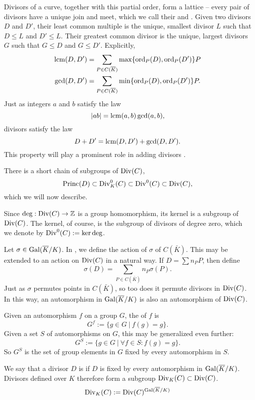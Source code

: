 Divisors of a curve, together with this partial order, form a lattice --
every pair of divisors have a unique join and meet,
which we call their  and .
Given two divisors $D$ and $D'$, their least common multiple is the unique, smallest divisor $L$ such that $D \leq L$ and $D' \leq L$.
Their greatest common divisor is the unique, largest divisors $G$ such that $G \leq D$ and $G \leq D'$.
Explicitly,
\begin{align*}
  \operatorname{lcm}(D, D') &= \sum_{P \in C(\overline K)}\max\{\operatorname{ord}_P(D), \operatorname{ord}_P(D')\}P \\
  \gcd(D, D') &= \sum_{P \in C(\overline K)}\min\{\operatorname{ord}_P(D), \operatorname{ord}_P(D')\}P.
\end{align*}
Just as integers $a$ and $b$ satisfy the law
  \[ \left| ab \right| = \operatorname{lcm}(a,b)\gcd(a,b), \]
divisors satisfy the law
  \[ D + D' = \operatorname{lcm}(D, D') + \gcd(D, D'). \]
This property will play a prominent role in adding divisors .

There is a short chain of subgroups of $\operatorname{Div}(C)$,
\[ \operatorname{Princ}(D) \subset \operatorname{Div}_K^0(C) \subset \operatorname{Div}^0(C) \subset \operatorname{Div}(C), \]
which we will now describe.

Since $\deg : \operatorname{Div}(C) \to \mathbb{Z}$ is a group homomorphism, its kernel is a subgroup of $\operatorname{Div}(C)$.
The kernel, of course, is the subgroup of divisors of degree zero, which we denote by $\operatorname{Div}^0(C) := \ker \deg$.

Let $\sigma \in \operatorname{Gal}(\overline K / K)$.
In , we define the action of $\sigma$ of $C(\bar K)$.
This may be extended to an action on $\operatorname{Div}(C)$ in a natural way.
If $D = \sum n_P P$, then define
\[ \sigma(D) = \sum_{P \in C(\bar K)} n_P \sigma(P). \]
Just as $\sigma$ permutes points in $C(\bar K)$, so too does it permute divisors in $\operatorname{Div}(C)$.
In this way, an automorphism in $\operatorname{Gal}(\overline K/K)$ is also an automorphism of $\operatorname{Div}(C)$.

Given an automorphism $f$ on a group $G$, the  of $f$ is
  \[ G^f := \{ g \in G ~|~ f(g) = g \}. \]
Given a set $S$ of automorphisms on $G$, this may be generalized even further:
  \[ G^S := \{ g \in G ~|~ \forall f \in S : f(g) = g \}. \]
So $G^S$ is the set of group elements in $G$ fixed by every automorphism in $S$.

We say that a divisor $D$ is  if $D$ is fixed by every automorphism in $\operatorname{Gal}(\overline K/K)$.
Divisors defined over $K$ therefore form a subgroup $\operatorname{Div}_K(C) \subset \operatorname{Div}(C)$.
  \[ \operatorname{Div}_K(C) := \operatorname{Div}(C)^{\operatorname{Gal}(\overline K/K)} \]

